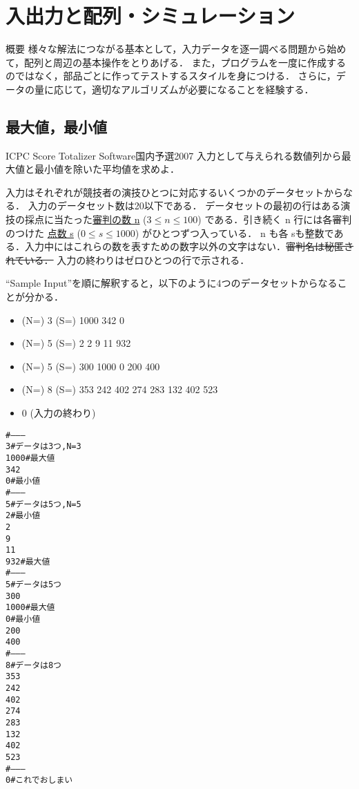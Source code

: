 \chapter{入出力と配列・シミュレーション}\label{chapter:io}
\begin{itembox}[l]{概要}
様々な解法につながる基本として，入力データを逐一調べる問題から始めて，配列と周辺の基本操作をとりあげる．
また，プログラムを一度に作成するのではなく，部品ごとに作ってテストするスタイルを身につける．
さらに，データの量に応じて，適切なアルゴリズムが必要になることを経験する．
\end{itembox}


\section{最大値，最小値}

\begin{psbox}{ICPC Score Totalizer Software}{国内予選2007}
入力として与えられる数値列から最大値と最小値を除いた平均値を求めよ．

入力はそれぞれが競技者の演技ひとつに対応するいくつかのデータセットからなる． 入力のデータセット数は20以下である．
データセットの最初の行はある演技の採点に当たった\uline{審判の数 n} ($3 \le n \le 100$) である．引き続く n 行には各審判のつけた \uline{点数 s} ($0 \le s \le 1000$) がひとつずつ入っている． n も各 sも整数である．入力中にはこれらの数を表すための数字以外の文字はない．\sout{審判名は秘匿されている．}
入力の終わりはゼロひとつの行で示される． 
  
\end{psbox}


``Sample Input''を順に解釈すると，以下のように4つのデータセットからなることが分かる．
\begin{itemize}
\item (N=) 3 (S=) 1000 342 0
\item (N=) 5 (S=) 2 2 9 11 932 
\item (N=) 5 (S=) 300 1000 0 200 400
\item (N=) 8 (S=) 353 242 402 274 283 132 402 523
\item 0 (入力の終わり)
\end{itemize}

\begin{alltt}
#--------
3 # データは3つ, N=3
1000 # 最大値
342
0 # 最小値
#--------
5 # データは5つ, N=5
2 # 最小値
2
9
11
932 # 最大値
#--------
5 # データは5つ
300
1000 # 最大値
0 # 最小値
200
400
#--------
8 # データは8つ
353
242
402
274
283
132
402
523
#--------
0 # これでおしまい
\end{alltt}


